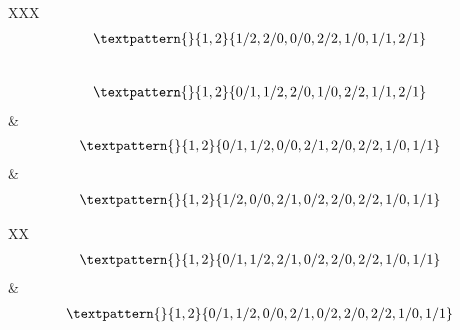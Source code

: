 \begin{center}
\begin{longtabu}[l]{XXX}
\begin{equation}
\begin{gathered}
		\textpattern{}{1,2}{1/2,2/0,0/0,2/2,1/0,1/1,2/1}
	\end{gathered}
	\label{cls:214}
\end{equation}
\\
\begin{equation}
	\begin{gathered}
		\textpattern{}{1,2}{0/1,1/2,2/0,1/0,2/2,1/1,2/1}
	\end{gathered}
	\label{cls:215}
\end{equation}
    &
\begin{equation}
	\begin{gathered}
		\textpattern{}{1,2}{0/1,1/2,0/0,2/1,2/0,2/2,1/0,1/1}
	\end{gathered}
	\label{cls:216}
\end{equation}
    &
\begin{equation}
	\begin{gathered}
		\textpattern{}{1,2}{1/2,0/0,2/1,0/2,2/0,2/2,1/0,1/1}
	\end{gathered}
	\label{cls:217}
\end{equation}
\end{longtabu}
\begin{longtabu}[l]{XX}
\begin{equation}
	\begin{gathered}
		\textpattern{}{1,2}{0/1,1/2,2/1,0/2,2/0,2/2,1/0,1/1}
	\end{gathered}
	\label{cls:218}
\end{equation}
    &
\begin{equation}
	\begin{gathered}
		\textpattern{}{1,2}{0/1,1/2,0/0,2/1,0/2,2/0,2/2,1/0,1/1}
	\end{gathered}
	\label{cls:219}
\end{equation}
\end{longtabu}
\end{center}
